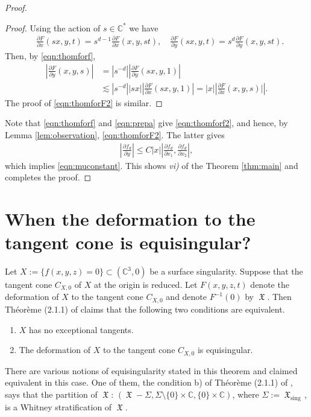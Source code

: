 \documentclass[12pt]{amsart}
\theoremstyle{definition}
\numberwithin{equation}{section}
\newcommand{\C}{\mathbb{C}}
\DeclareMathOperator{\sing}{sing \, }
\DeclareMathOperator{\frakX}{\mathfrak {X}}
\begin{document}
\begin{proof}
\begin{proof}
Using the action of $s\in \C^*$ we have 
\begin{align*}
& \frac{\partial F}{\partial x}(sx,y,t)=s^{d-1}\frac{\partial F}{\partial x}(x,y,st), \quad
 \frac{\partial F}{\partial y}(sx,y,t)=s^{d}\frac{\partial F}{\partial y}(x,y,st). 
\end{align*}
Then, by \eqref{eqn:thomforf}, 
 \begin{align*} 
\left|
\frac{\partial F}{\partial y}(x,y,s)\right | & =|s^{-d}|\left |\frac{\partial F}{\partial y}(sx,y,1)\right | \\ & \lesssim |s^{-d}||sx|\left |\frac{\partial F}{\partial x}(sx,y,1)\right | = |x| \left |\frac{\partial F}{\partial x}(x,y,s)|\right|.
\end{align*}
The proof of \eqref{eqn:thomforF2} is similar.  
\end{proof}


Note that \eqref{eqn:thomforf} and \eqref{eqn:prepa} give \eqref{eqn:thomforf2}, and hence, by Lemma \ref{lem:observation}, \eqref{eqn:thomforF2}. The latter gives 
\begin{align*}%
\left |\frac{\partial f_d}{\partial y} \right| \leq C |x| \left| \frac{\partial f_d}{\partial x_1} , \frac{\partial f_d}{\partial x_2} \right| ,
\end{align*}
which implies \eqref{eqn:muconstant}.  This shows \emph{vi)} of the Theorem \ref{thm:main}
and completes the proof.  
\end{proof}

\section{When the deformation to the tangent cone is equisingular?}\label{sec:deformation}

Let $X:=\{f(x,y,z)=0\}\subset (\C^3,0)$ be a surface singularity.  Suppose that the tangent cone $C_{X,0}$ of $X$ at the origin is reduced. Let $F(x,y,z,t)$ denote the deformation of $X$ to the tangent cone $C_{X,0}$ and denote $F^{-1}(0)$ by $\frakX $. Then Théorème (2.1.1) of \cite{LT79} claims that 
the following two conditions are equivalent.
\begin{enumerate}
  \item
$X$ has no exceptional tangents.
\item
The deformation of $X$ to the tangent cone $C_{X,0}$ is equisingular.
\end{enumerate}
There are various notions of equisingularity stated in this theorem and claimed equivalent in this case.  One of them, the condition b) of Théorème (2.1.1) of \cite{LT79}, says that the partition of $\frakX$: $(\frakX - \Sigma, \Sigma \setminus \{0\} \times \C, \{0\} \times \C)$, where $\Sigma:=\frakX_{\sing}$, is a Whitney stratification of $\frakX$. 
\end{document}
